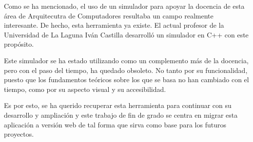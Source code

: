 Como se ha mencionado, el uso de un simulador para apoyar la docencia de esta área
de Arquitecutra de Computadores resultaba un campo realmente interesante. De hecho,
esta herramienta ya existe. El actual profesor de la Universidad de La Laguna 
Iván Castilla desarrolló un simulador en C++ con este propósito.

\bigskip
Este simulador se ha estado utilizando como un complemento más de la docencia, pero
con el paso del tiempo, ha quedado obsoleto. No tanto por su funcionalidad, puesto
que los fundamentos teóricos sobre los que se basa no han cambiado con el tiempo, como 
por su aspecto visual y su accesibilidad.

\bigskip
Es por esto, se ha querido recuperar esta herramienta para continuar con su desarrollo 
y ampliación y este trabajo de fin de grado se centra en migrar esta aplicación a versión 
web de tal forma que sirva como base para los futuros proyectos.